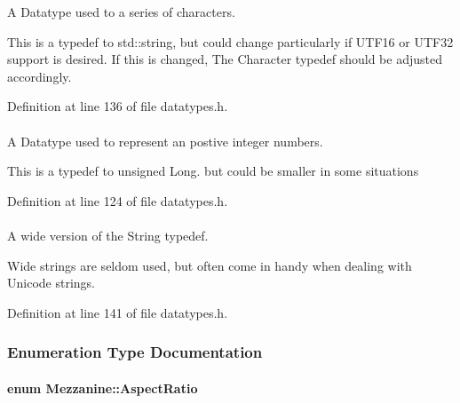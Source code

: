 A Datatype used to a series of characters. 

This is a typedef to std::string, but could change particularly if UTF16 or UTF32 support is desired. If this is changed, The Character typedef should be adjusted accordingly. 

Definition at line 136 of file datatypes.h.

\hypertarget{namespaceMezzanine_adcbb6ce6d1eb4379d109e51171e2e493}{
\paragraph[{Whole}]{}\hfill}
\label{namespaceMezzanine_adcbb6ce6d1eb4379d109e51171e2e493}


A Datatype used to represent an postive integer numbers. 

This is a typedef to unsigned Long. but could be smaller in some situations 

Definition at line 124 of file datatypes.h.

\hypertarget{namespaceMezzanine_a08b3adb0d2632e4f6a454fdf3cf5efda}{
\paragraph[{WideString}]{}\hfill}
\label{namespaceMezzanine_a08b3adb0d2632e4f6a454fdf3cf5efda}


A wide version of the String typedef. 

Wide strings are seldom used, but often come in handy when dealing with Unicode strings. 

Definition at line 141 of file datatypes.h.



\subsubsection{Enumeration Type Documentation}
\hypertarget{namespaceMezzanine_a4f14cccd98d1bdc1bf934c1c028e3eaf}{
\paragraph[{AspectRatio}]{\setlength{\rightskip}{0pt plus 5cm}enum {\bf Mezzanine::AspectRatio}}\hfill}
\label{namespaceMezzanine_a4f14cccd98d1bdc1bf934c1c028e3eaf}


